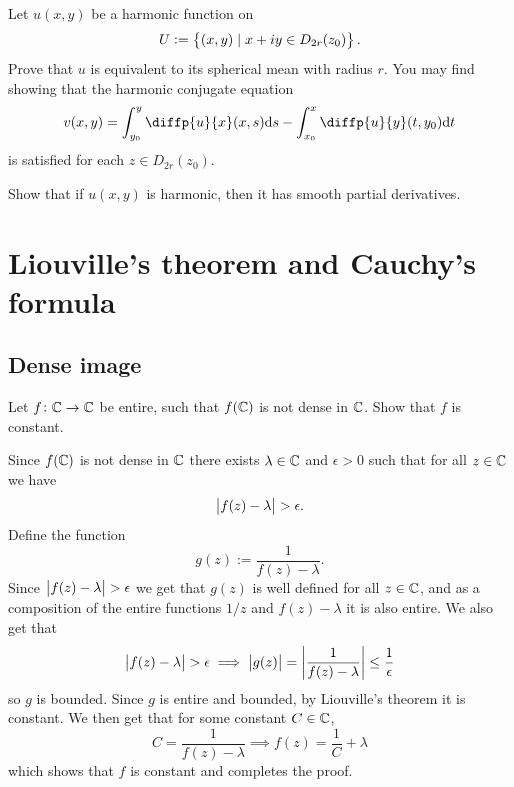 \documentclass[11pt,a4paper]{article}
\begin{document}
\begin{exercise}
  Let $u(x,y)$ be a harmonic function on
  \[
    U := \left\{(x,y) \mid x + i y \in D_{2r}(z_0)\right\}.
  \]
  Prove that $u$ is equivalent to its spherical mean with radius $r$.
  You may find showing that the harmonic conjugate equation
  \[
    v(x,y) =
    \int_{y_0}^{y} \diffp{u}{x}(x,s) \ds -
    \int_{x_0}^{x} \diffp{u}{y}(t,y_0) \dt
  \]
  is satisfied for each $z \in D_{2r}(z_0)$.
\end{exercise}
\begin{solution}

\end{solution}

\begin{exercise}
  Show that if $u(x,y)$ is harmonic, then it has smooth partial derivatives.
\end{exercise}
\begin{solution}

\end{solution}

\newpage
\section{Liouville's theorem and Cauchy's formula}
\subsection{Dense image}
\begin{exercise}
  Let $f \colon \mathbb{C} \to \mathbb{C}$ be entire, such that $f(\mathbb{C})$ is not dense in $\mathbb{C}$.
  Show that $f$ is constant.
\end{exercise}
\begin{solution}
  Since $f(\mathbb{C})$ is not dense in $\mathbb{C}$ there exists $\lambda \in \mathbb{C}$ and
  $\epsilon > 0$ such that for all $z \in \mathbb{C}$ we have
  \[
    \left\lvert f(z) - \lambda\right\rvert > \epsilon.
  \]
  Define the function
  \[
    g(z) := \frac{1}{f(z) - \lambda}.
  \]
  Since $\left\lvert f(z) - \lambda\right\rvert > \epsilon$ we get that $g(z)$ is well
  defined for all $z \in \mathbb{C}$, and as a composition of the entire functions
  $1/z$ and $f(z) - \lambda$ it is also entire.
  We also get that
  \[
    \left\lvert f(z) - \lambda\right\rvert > \epsilon
    \implies
    \left\lvert g(z)\right\rvert = \left\lvert\frac{1}{f(z) - \lambda}\right\rvert \le \frac{1}{\epsilon}
  \]
  so $g$ is bounded.
  Since $g$ is entire and bounded, by Liouville's theorem it is constant.
  We then get that for some constant $C \in \mathbb{C}$,
  \[
    C = \frac{1}{f(z) - \lambda}
    \implies
    f(z) = \frac{1}{C} + \lambda
  \]
  which shows that $f$ is constant and completes the proof.
\end{solution}
\end{document}
